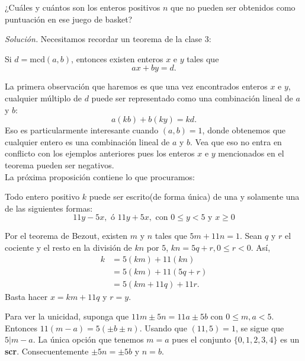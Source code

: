 \documentclass[12pt]{scrartcl}
\begin{document}
\begin{example}
¿Cuáles y cuántos son los enteros positivos $n$ que no pueden ser obtenidos como puntuación en ese juego de basket?
\end{example}

\textit{Solución.} Necesitamos recordar un teorema de la clase 3:

\begin{theorem}[Bezout]
Si $d=\mbox{mcd}(a,b)$, entonces existen enteros $x$ e $y$ tales que $$ax+by=d.$$
\end{theorem}
La primera observación que haremos es que una vez encontrados enteros $x$ e $y$, cualquier múltiplo de $d$ puede ser representado como una combinación lineal de $a$ y $b$:$$a(kb)+b(ky)=kd.$$ Eso es particularmente interesante cuando $(a,b)=1$, donde obtenemos que cualquier entero es una combinación lineal de $a$ y $b$. Vea que eso no entra en conflicto con los ejemplos anteriores pues los enteros $x$ e $y$ mencionados en el teorema pueden ser negativos.\\

La próxima proposición contiene lo que procuramos:
\begin{proposition}
Todo entero positivo $k$ puede ser escrito(de forma única) de una y solamente una de las siguientes formas: $$11y-5x,\mbox{ ó } 11y+5x,\mbox{ con } 0\le y<5 \mbox{ y } x\ge 0$$
\end{proposition}
Por el teorema de Bezout, existen $m$ y $n$ tales que $5m+11n=1$. Sean $q$ y $r$ el cociente y el resto en la división de $kn$ por $5$, $kn=5q+r,0\le r<0$. Así, \begin{align*}
k & = 5(km)+11(kn)\\
& = 5(km)+11(5q+r)\\
& = 5(km+11q)+11r.
\end{align*}
Basta hacer $x=km+11q$ y $r=y$. 

Para ver la unicidad, suponga que $11m\pm 5n=11a\pm 5b$ con $0\le m,a<5$. Entonces $11(m-a)=5(\pm b\pm n)$. Usando que $(11,5)=1$, se sigue que $5|m-a$. La única opción que tenemos $m=a$ pues el conjunto $\{0,1,2,3,4\}$ es un \textbf{scr}. Consecuentemente $\pm 5n =\pm 5b$ y $n=b$.\\
\end{document}
